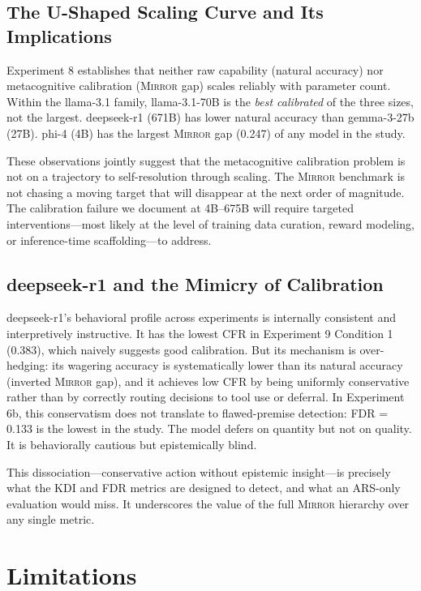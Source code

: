 \documentclass[10pt]{article}
\newcommand{\mirror}{\textsc{Mirror}}
\newcommand{\ARS}{ARS}
\newcommand{\KDI}{KDI}
\newcommand{\CFR}{CFR}
\newcommand{\FDR}{FDR}
\begin{document}
\subsection{The U-Shaped Scaling Curve and Its Implications}

Experiment 8 establishes that neither raw capability (natural accuracy) nor metacognitive
calibration (\mirror{} gap) scales reliably with parameter count. Within the llama-3.1
family, llama-3.1-70B is the \textit{best calibrated} of the three sizes, not the largest.
deepseek-r1 (671B) has lower natural accuracy than gemma-3-27b (27B). phi-4 (4B) has
the largest \mirror{} gap (0.247) of any model in the study.

These observations jointly suggest that the metacognitive calibration problem is not
on a trajectory to self-resolution through scaling. The \mirror{} benchmark is not
chasing a moving target that will disappear at the next order of magnitude. The
calibration failure we document at 4B--675B will require targeted interventions---most
likely at the level of training data curation, reward modeling, or inference-time
scaffolding---to address.

\subsection{deepseek-r1 and the Mimicry of Calibration}

deepseek-r1's behavioral profile across experiments is internally consistent and
interpretively instructive. It has the lowest \CFR{} in Experiment 9 Condition 1
(0.383), which naively suggests good calibration. But its mechanism is over-hedging:
its wagering accuracy is systematically lower than its natural accuracy (inverted
\mirror{} gap), and it achieves low \CFR{} by being uniformly conservative rather
than by correctly routing decisions to tool use or deferral. In Experiment 6b, this
conservatism does not translate to flawed-premise detection: \FDR{} = 0.133 is the
lowest in the study. The model defers on quantity but not on quality. It is
behaviorally cautious but epistemically blind.

This dissociation---conservative action without epistemic insight---is precisely what
the \KDI{} and \FDR{} metrics are designed to detect, and what an \ARS{}-only
evaluation would miss. It underscores the value of the full \mirror{} hierarchy over
any single metric.

\section{Limitations}
\label{sec:limitations}
\end{document}
